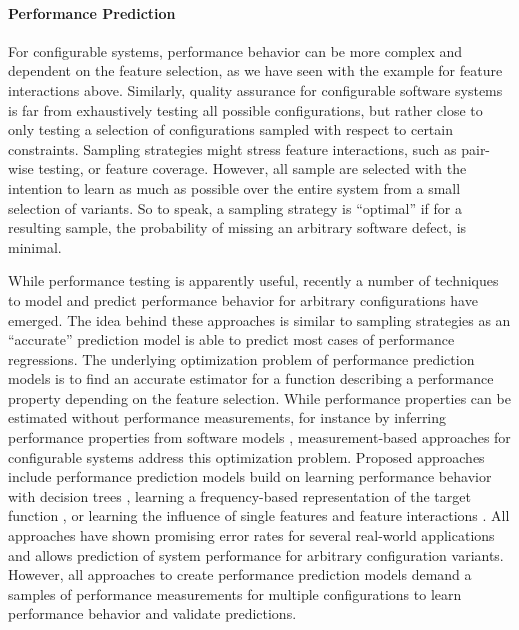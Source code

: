\paragraph{Performance Prediction}
For configurable systems, performance behavior can be more complex and
dependent on the feature selection, as we have seen with the example for
feature interactions above. Similarly, quality assurance for configurable
software systems is far from exhaustively testing all possible configurations,
but rather close to only testing a selection of configurations sampled with
respect to certain constraints. Sampling strategies might stress feature
interactions, such as pair-wise testing, or feature coverage. However, all
sample are selected with the intention to learn as much as possible over the
entire system from a small selection of variants. So to speak, a sampling
strategy is ``optimal'' if for a resulting sample, the probability of missing an
arbitrary software defect, is minimal.

While performance testing is apparently useful, recently a number of techniques
to model and predict performance behavior for arbitrary configurations have
emerged. The idea behind these approaches is similar to sampling strategies as
an ``accurate'' prediction model is able to predict most cases of performance
regressions. The underlying optimization problem of performance prediction
models is to find an accurate estimator for a function describing a performance
property depending on the feature selection. While performance properties can
be estimated without performance measurements, for instance by inferring
performance properties from software models \citep{woodside_future_2007},
measurement-based approaches for configurable systems address this optimization problem.  Proposed
approaches include performance prediction models build on learning performance behavior
with decision trees \citep{guo_variability-aware_2013}, learning a
frequency-based representation of the target function
\citep{zhang_performance_2015}, or learning the influence of single features and feature interactions
\citep{siegmund_predicting_2012,siegmund_performance-influence_2015}. All approaches have shown promising error rates for several real-world applications and allows prediction
of system performance for arbitrary configuration variants. However, all
approaches to create performance prediction models demand a samples of
performance measurements for multiple configurations to learn performance behavior and validate predictions.

